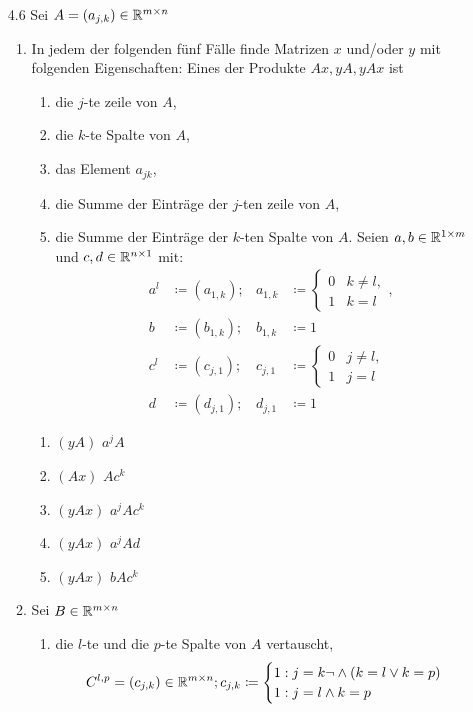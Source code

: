 \documentclass{HM}
\begin{document}
\begin{enumerate}
\begin{enumerate}
\end{enumerate}
\item [4.6] Sei $A=(a_{j,k})\in\R^{m\times n}$
\begin{enumerate}
\item In jedem der folgenden fünf Fälle finde Matrizen $x$ und/oder $y$ mit folgenden Eigenschaften: Eines der Produkte $Ax, yA, yAx$ ist
\begin{enumerate}
\item die $j$-te zeile von $A$,
\item die $k$-te Spalte von $A$,
\item das Element $a_{jk}$,
\item die Summe der Einträge der $j$-ten zeile von $A$,
\item die Summe der Einträge der $k$-ten Spalte von $A$.
Seien $a,b\in\R^{1\times m}$ und $c,d\in\R^{n\times 1}$ mit:
\begin{align*}
a^l&\coloneqq (a_{1,k}); &a_{1,k}&\coloneqq\begin{cases}
0 &k\neq l,\\
1 &k=l 
\end{cases},\\
b&\coloneqq (b_{1,k}); &b_{1,k}&\coloneqq 1\\
c^l&\coloneqq (c_{j,1}); &c_{j,1}&\coloneqq \begin{cases}
0 &j\neq l,\\
1 &j=l
\end{cases}\\
d&\coloneqq (d_{j,1}); &d_{j,1}&\coloneqq 1
\end{align*}
\end{enumerate}
\begin{enumerate}
\item $(yA)$  $a^jA$
\item $(Ax)$  $Ac^k$
\item $(yAx)$ $a^jAc^k$
\item $(yAx)$ $a^jAd$
\item $(yAx)$ $bAc^k$
\end{enumerate}
\item Sei $B\in\R^{m\times n}$
\begin{enumerate}
\item die $l$-te und die $p$-te Spalte von $A$ vertauscht,\\
$$C^{l,p} = (c_{j,k}) \in \R^{m\times n}; c_{j,k} \coloneqq \begin{cases}
	1: j=k \lnot\land (k=l \lor k=p)\\
	1: j=l \land k=p\\

\end{cases}$$
\end{enumerate}
\end{enumerate}
\end{enumerate}
\end{document}
